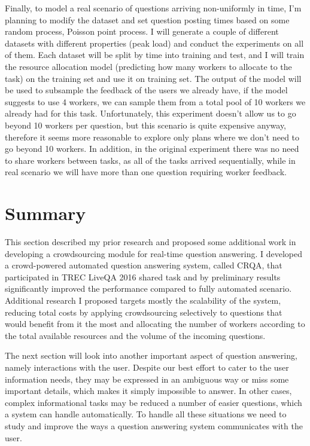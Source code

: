 Finally, to model a real scenario of questions arriving non-uniformly in time, I'm planning to modify the dataset and set question posting times based on some random process, \eg Poisson point process.
I will generate a couple of different datasets with different properties (\eg peak load) and conduct the experiments on all of them.
Each dataset will be split by time into training and test, and I will train the resource allocation model (predicting how many workers to allocate to the task) on the training set and use it on training set.
The output of the model will be used to subsample the feedback of the users we already have, \eg if the model suggests to use 4 workers, we can sample them from a total pool of 10 workers we already had for this task.
Unfortunately, this experiment doesn't allow us to go beyond 10 workers per question, but this scenario is quite expensive anyway, therefore it seems more reasonable to explore only plans where we don't need to go beyond 10 workers.
In addition, in the original experiment there was no need to share workers between tasks, as all of the tasks arrived sequentially, while in real scenario we will have more than one question requiring worker feedback.

\section{Summary}
\label{section:crowdsourcing:summary}

This section described my prior research and proposed some additional work in developing a crowdsourcing module for real-time question answering.
I developed a crowd-powered automated question answering system, called CRQA, that participated in TREC LiveQA 2016 shared task and by preliminary results significantly improved the performance compared to fully automated scenario.
Additional research I proposed targets mostly the scalability of the system, \ie reducing total costs by applying crowdsourcing selectively to questions that would benefit from it the most and allocating the number of workers according to the total available resources and the volume of the incoming questions.

The next section will look into another important aspect of question answering, namely interactions with the user.
Despite our best effort to cater to the user information needs, they may be expressed in an ambiguous way or miss some important details, which makes it simply impossible to answer.
In other cases, complex informational tasks may be reduced a number of easier questions, which a system can handle automatically.
To handle all these situations we need to study and improve the ways a question answering system communicates with the user.
